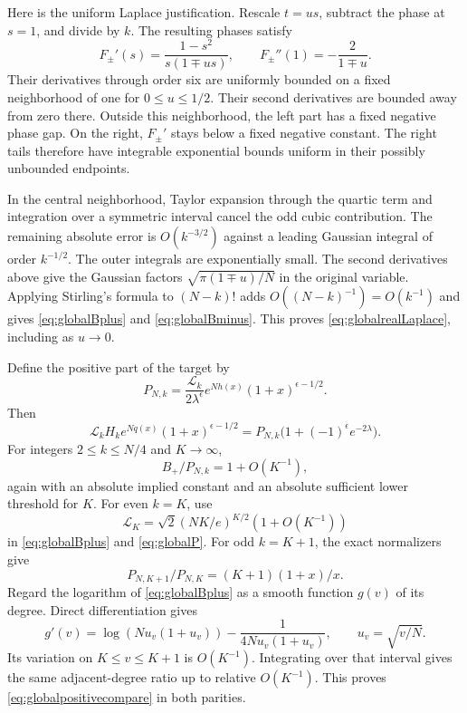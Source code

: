\documentclass[11pt]{article}
\theoremstyle{definition}
\theoremstyle{remark}
\newcommand{\1}{\mathbf 1}
\begin{document}
Here is the uniform Laplace justification. Rescale $t=us$, subtract the phase at $s=1$, and divide by $k$. The resulting phases satisfy
\[
F_\pm'(s)=\frac{1-s^2}{s(1\mp us)},\qquad
F_\pm''(1)=-\frac2{1\mp u}.
\]
Their derivatives through order six are uniformly bounded on a fixed neighborhood of one for $0\le u\le1/2$. Their second derivatives are bounded away from zero there. Outside this neighborhood, the left part has a fixed negative phase gap. On the right, $F_\pm'$ stays below a fixed negative constant. The right tails therefore have integrable exponential bounds uniform in their possibly unbounded endpoints.

In the central neighborhood, Taylor expansion through the quartic term and integration over a symmetric interval cancel the odd cubic contribution. The remaining absolute error is $O(k^{-3/2})$ against a leading Gaussian integral of order $k^{-1/2}$. The outer integrals are exponentially small. The second derivatives above give the Gaussian factors $\sqrt{\pi(1\mp u)/N}$ in the original variable. Applying Stirling's formula to $(N-k)!$ adds $O((N-k)^{-1})=O(k^{-1})$ and gives \eqref{eq:globalBplus} and \eqref{eq:globalBminus}. This proves \eqref{eq:globalrealLaplace}, including as $u\to0$.

Define the positive part of the target by
\begin{equation}\label{eq:globalP}
P_{N,k}=\frac{\mathcal L_k}{2\lambda^\epsilon}
e^{Nh(x)}(1+x)^{\epsilon-1/2}.
\end{equation}
Then
\begin{equation}\label{eq:globaltargetsplit}
\mathcal L_kH_ke^{Nq(x)}(1+x)^{\epsilon-1/2}
=P_{N,k}\bigl(1+(-1)^\epsilon e^{-2\lambda}\bigr).
\end{equation}
For integers $2\le k\le N/4$ and $K\to\infty$,
\begin{equation}\label{eq:globalpositivecompare}
B_+/P_{N,k}=1+O(K^{-1}),
\end{equation}
again with an absolute implied constant and an absolute sufficient lower threshold for $K$. For even $k=K$, use
\[
\mathcal L_K=\sqrt2(NK/e)^{K/2}(1+O(K^{-1}))
\]
in \eqref{eq:globalBplus} and \eqref{eq:globalP}. For odd $k=K+1$, the exact normalizers give
\[
P_{N,K+1}/P_{N,K}=(K+1)(1+x)/x.
\]
Regard the logarithm of \eqref{eq:globalBplus} as a smooth function $g(v)$ of its degree. Direct differentiation gives
\[
g'(v)=\log(Nu_v(1+u_v))-\frac1{4Nu_v(1+u_v)},
\qquad u_v=\sqrt{v/N}.
\]
Its variation on $K\le v\le K+1$ is $O(K^{-1})$. Integrating over that interval gives the same adjacent-degree ratio up to relative $O(K^{-1})$. This proves \eqref{eq:globalpositivecompare} in both parities.
\end{document}
